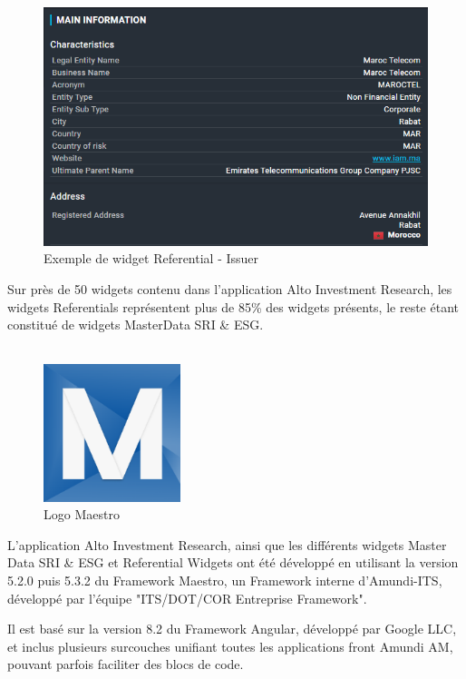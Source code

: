 \begin{figure}[ht]
    \centering
    \includegraphics[width=\columnwidth]{img/IssuerWidgetIAM.png}
    \caption{Exemple de widget Referential - Issuer}
    \label{fig:IssuerMaestro}
\end{figure}
\par Sur près de 50 widgets contenu dans l'application Alto Investment Research, les widgets Referentials représentent plus de 85\% des widgets présents, le reste étant constitué de widgets MasterData SRI \& ESG.
\\~\\
\begin{figure}[ht]
    \centering
    \includegraphics[width=4cm]{img/MAES.png}
    \caption{Logo Maestro}
    \label{fig:maes}
\end{figure}
\par L'application Alto Investment Research, ainsi que les différents widgets Master Data SRI \& ESG et Referential Widgets ont été développé en utilisant la version 5.2.0 puis 5.3.2 du Framework Maestro, un Framework interne d'Amundi-ITS, développé par l'équipe "ITS/DOT/COR Entreprise Framework".
\clearpage
\par Il est basé sur la version 8.2 du Framework Angular, développé par Google LLC, et inclus plusieurs surcouches unifiant toutes les applications front Amundi AM, pouvant parfois faciliter des blocs de code.\\
